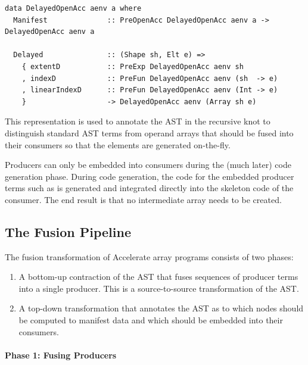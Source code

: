 \begin{lstlisting}[style=haskell
    ,name=DelayedOpenAcc
    ,label=lst:DelayedOpenAcc
    ,caption={The type of delayed arrays in Accelerate}]
data DelayedOpenAcc aenv a where
  Manifest              :: PreOpenAcc DelayedOpenAcc aenv a -> DelayedOpenAcc aenv a

  Delayed               :: (Shape sh, Elt e) =>
    { extentD           :: PreExp DelayedOpenAcc aenv sh
    , indexD            :: PreFun DelayedOpenAcc aenv (sh  -> e)
    , linearIndexD      :: PreFun DelayedOpenAcc aenv (Int -> e)
    }                   -> DelayedOpenAcc aenv (Array sh e)
\end{lstlisting}

This representation is used to annotate the AST in
the recursive knot to distinguish standard AST terms from operand arrays that
should be fused into their consumers so that the elements are generated
on-the-fly.

Producers can only be embedded into consumers during the (much later) code
generation phase. During code generation, the code for the embedded producer
terms such as  is generated and integrated directly into the
skeleton code of the consumer. The end result is that no intermediate array
needs to be created.


\subsection{The Fusion Pipeline}
\label{sec:fusion_pipeline}

The fusion transformation of Accelerate array programs consists of two phases:
%
\begin{enumerate}
    \item A bottom-up contraction of the AST that fuses sequences of producer
        terms into a single producer. This is a source-to-source transformation
        of the AST.

    \item A top-down transformation that annotates the AST as to which nodes
        should be computed to manifest data and which should be embedded into
        their consumers.
\end{enumerate}

\paragraph{Phase 1: Fusing Producers}
\label{sec:fusing_producers}

